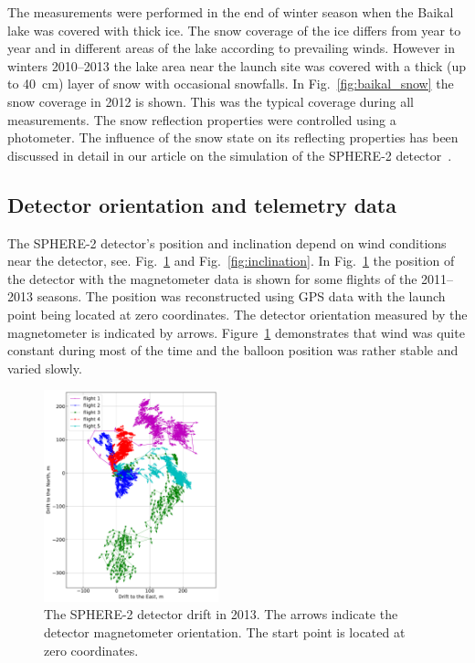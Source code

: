 \documentclass[preprint,5p,times]{elsarticle}
\begin{document}
The measurements were performed in the end of winter season when the Baikal lake was covered with thick ice. The snow coverage of the ice differs from year to year and in different areas of the lake according to prevailing winds. However in winters 2010--2013 the lake area near the launch site was covered with a thick (up to 40~cm) layer of snow with occasional snowfalls. In Fig.~\ref{fig:baikal_snow} the snow coverage in 2012 is shown. This was the typical coverage during all measurements. The snow reflection properties were controlled using a photometer. The influence of the snow state on its reflecting properties has been discussed in detail in our article on the simulation of the SPHERE-2 detector~\cite{Ant19}.

\subsection{Detector orientation and telemetry data}
\label{sect:telemetrydata}

The \mbox{SPHERE-2} detector's position and inclination depend on wind conditions near the detector, see. Fig.~\ref{fig:gps_compass} and Fig.~\ref{fig:inclination}. In Fig.~\ref{fig:gps_compass} the position of the detector with the magnetometer data is shown for some flights of the 2011--2013 seasons. The position was reconstructed using GPS data with the launch point being located at zero coordinates. The detector orientation measured by the magnetometer is indicated by arrows. Figure~\ref{fig:gps_compass} demonstrates that wind was quite constant during most of the time and the balloon position was rather stable and varied slowly.  
\begin{figure}[tb]
    \includegraphics[width=0.45\textwidth]{GPS+quiver.pdf}\hspace{2pc}%
    \caption{The SPHERE-2 detector drift in 2013. The arrows indicate the detector magnetometer orientation. The start point is located at zero coordinates.}
\label{fig:gps_compass}
\end{figure}
\end{document}

